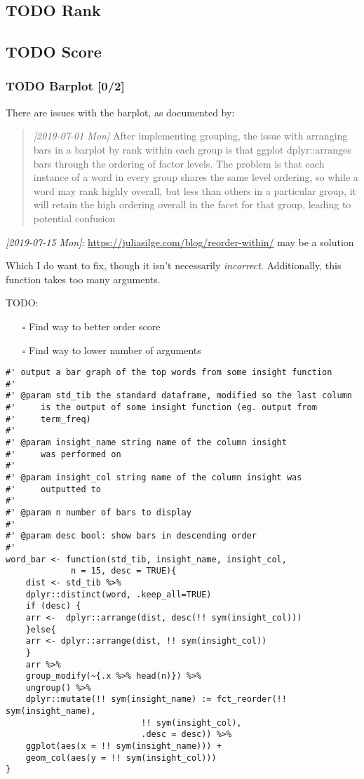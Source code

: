 \documentclass[a4paper, 11pt]{article}
\begin{document}
\subsection{{\bfseries\sffamily TODO} Rank}
\label{sec:org616db2a}
\subsection{{\bfseries\sffamily TODO} Score}
\label{sec:orgbe3e634}
\subsubsection{{\bfseries\sffamily TODO} Barplot [0/2]}
\label{sec:org78a27d1}
There are issues with the barplot, as documented by:
\begin{quote}
\textit{[2019-07-01 Mon] } After implementing grouping, the issue with arranging
bars in a barplot by rank within each group is that ggplot dplyr::arranges
bars through the ordering of factor levels. The problem is that each
instance of a word in every group shares the same level ordering, so
while a word may rank highly overall, but less than others in a
particular group, it will retain the high ordering overall in the
facet for that group, leading to potential confusion
\end{quote}

\textit{[2019-07-15 Mon]}: \url{https://juliasilge.com/blog/reorder-within/} may be a solution

Which I do want to fix, though it isn't necessarily \emph{incorrect}.
Additionally, this function takes too many arguments.

TODO:
\begin{itemize}
\item[{$\square$}] Find way to better order score
\item[{$\square$}] Find way to lower number of arguments
\end{itemize}
\begin{verbatim}
#' output a bar graph of the top words from some insight function
#'
#' @param std_tib the standard dataframe, modified so the last column
#'     is the output of some insight function (eg. output from
#'     term_freq)
#'
#' @param insight_name string name of the column insight
#'     was performed on
#' 
#' @param insight_col string name of the column insight was
#'     outputted to
#'
#' @param n number of bars to display
#'
#' @param desc bool: show bars in descending order
#'
word_bar <- function(std_tib, insight_name, insight_col,
		     n = 15, desc = TRUE){
    dist <- std_tib %>%
	dplyr::distinct(word, .keep_all=TRUE)
    if (desc) {
	arr <-  dplyr::arrange(dist, desc(!! sym(insight_col)))
    }else{
	arr <- dplyr::arrange(dist, !! sym(insight_col))
    }
    arr %>%
	group_modify(~{.x %>% head(n)}) %>%
	ungroup() %>%
	dplyr::mutate(!! sym(insight_name) := fct_reorder(!! sym(insight_name),
						   !! sym(insight_col),
						   .desc = desc)) %>%
	ggplot(aes(x = !! sym(insight_name))) +
	geom_col(aes(y = !! sym(insight_col)))
}
\end{verbatim}
\end{document}
